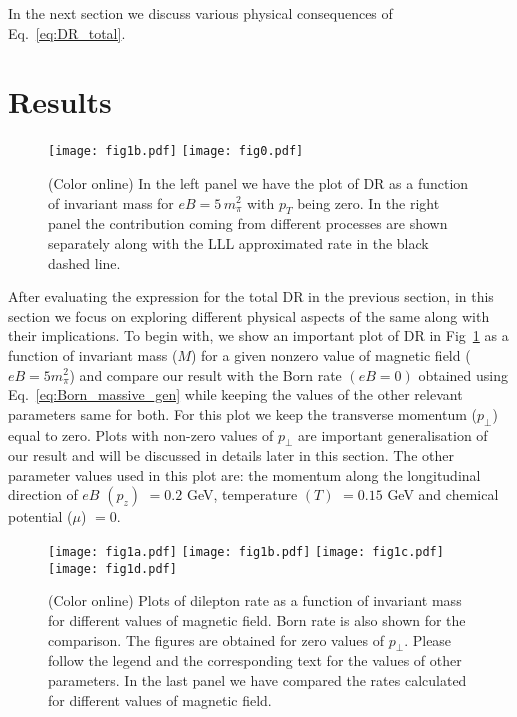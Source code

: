 \documentclass[aps,prd,floatfix,showpacs,showkeys,superscriptadress,unsortedaddress,nofootinbib,onecolumn]{revtex4-1}
\newcommand{\sperp}{\scriptscriptstyle{\perp}}
\begin{document}
In the next section we discuss various physical consequences of Eq.~\eqref{eq:DR_total}.




\section{Results}
\label{sec:res}
\begin{figure}
\begin{center}
\texttt{[image: fig1b.pdf]}
\texttt{[image: fig0.pdf]}
\caption{(Color online) In the left panel we have the plot of DR as a function of invariant mass for $eB=5\,m_\pi^2$ with $p_T$ being zero. In the right panel the contribution coming from different processes are shown separately along with the LLL approximated rate in the black dashed line.}
\label{fig:dr_diff_process}
\end{center}
\end{figure}
After evaluating the expression for the total DR in the previous section, in this section we focus on exploring different physical aspects of the same along with their implications. To begin with, we show an important plot of DR in Fig~\ref{fig:dr_diff_process} as a function of invariant mass ($M$) for a given nonzero value of magnetic field ($eB=5m_\pi^2$) and compare our result with the Born rate $(eB=0)$ obtained using Eq.~\eqref{eq:Born_massive_gen} while keeping the values of the other relevant parameters same for both. For this plot we keep the transverse momentum ($p_{\sperp}$) equal to zero. Plots with non-zero values of $p_{\sperp}$ are important generalisation of our result and will be discussed in details later in this section. The other parameter values used in this plot are: the momentum along the longitudinal direction of $eB$ $(p_z)$ $=0.2$ GeV, temperature $(T)$ $=0.15$ GeV and chemical potential ($\mu$) $=0$.
\begin{figure}
\begin{center}
\texttt{[image: fig1a.pdf]}
\texttt{[image: fig1b.pdf]}
\texttt{[image: fig1c.pdf]}
\texttt{[image: fig1d.pdf]}
\caption{(Color online) Plots of dilepton rate as a function of invariant mass for different values of magnetic field. Born rate is also shown for the comparison. The figures are obtained for zero values of $p_{\sperp}$. Please follow the legend and the corresponding text for the values of other parameters. In the last panel we have compared the rates calculated for different values of magnetic field.}
\label{fig:dr_diff_eB}
\end{center}
\end{figure}
\end{document}
